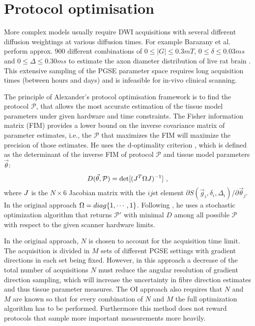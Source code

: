 \section{Protocol optimisation}
More complex models usually require DWI acquisitions with several different diffusion weightings at various diffusion times. For example Barazany et al.\cite{assaf08} perform approx. 900 different combinations of $0\le|G|\le 0.3mT$, $0\le \delta \le 0.03ms$ and $0\le \Delta \le 0.30ms$ to estimate the axon diameter distribution of live rat brain \cite{TODO}. This extensive sampling of the PGSE parameter space requires long acquisition times (between hours and days) and is infeasible for in-vivo clinical scanning. 

The principle of Alexander's protocol optimisation framework\cite{alexander08} is to find the protocol $\mathcal{P}$, that allows the most accurate estimation of the tissue model parameters under given hardware and time constraints. The Fisher information matrix (FIM) provides a lower bound on the inverse covariance matrix of parameter estimates, i.e., the $\mathcal{P}$ that maximizes the FIM will maximize the precision of those estimates. He uses the d-optimality criterion \cite{obrien2003}, which is defined as the determinant of the inverse FIM of protocol $\mathcal{P}$ and tissue model parameters $\vec{\theta}$:
\begin{equation}
	D(\vec{\theta},\mathcal{P})=\det[(J^T\Omega J)^{-1}]~, 
	\label{eq-optimality}
\end{equation}
where $J$ is the $N\times6$ Jacobian matrix with the $ij$st element $\partial S(\vec{g}_i,\delta_i,\Delta_i) / \partial \vec{\theta}_j$. In the original approach $\Omega=diag\{1,\cdots,1\}$. Following \cite{alexander2008}, he uses a stochastic optimization algorithm \cite{zelinka2000} that returns $\mathcal{P}'$ with minimal $D$ among all possible $\mathcal{P}$ with respect to the given scanner hardware limits.

In the original approach, $N$ is chosen to account for the acquisition time limit. The acquisition is divided in $M$ sets of different PGSE settings with gradient directions in each set being fixed. However, in this approach a decrease of the total number of acquisitions $N$ must reduce the angular resolution of gradient direction sampling, which will increase the uncertainty in fibre direction estimates and thus tissue parameter measures. The OI approach also requires that $N$ and $M$ are known so that for every combination of $N$ and $M$ the full optimization algorithm has to be performed. Furthermore this method does not reward protocols that sample more important measurements more heavily.
